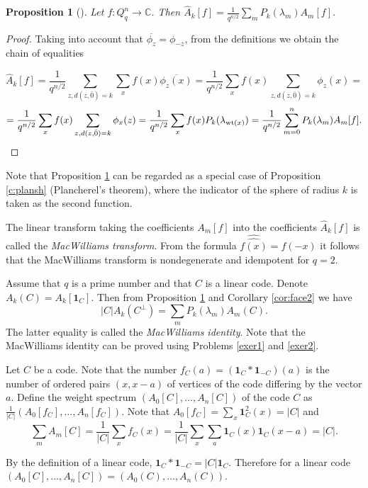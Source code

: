 \documentclass[11pt]{article}
\newtheorem{claim}{Proposition}[section]
\theoremstyle{definition}
\newcommand{\wt}{{\rm wt}}
\begin{document}
{{{\begin{claim}[\cite{MacW}]\label{c:eqMW}
Let $f:Q^n_q\rightarrow \mathbb{C}$. Then $\widehat{A}_k[f]=
\frac{1}{q^{n/2}}\sum\limits_m P_k(\lambda_m)A_m[f]$.
\end{claim}
\begin{proof}
Taking into account that $\overline{\phi_z}=\phi_{-z}$, from the definitions we obtain the chain of equalities

$$\widehat{A}_k[f]=\frac{1}{q^{n/2}}\sum\limits_{z,d(z,\bar 0)=k}\sum\limits_x
f(x)\overline{\phi_z(x)} = \frac{1}{q^{n/2}}\sum\limits_x
f(x)\sum\limits_{z,d(z,\bar 0)=k}\phi_z(x)=$$
$$=\frac{1}{q^{n/2}}\sum\limits_x
f(x)\sum\limits_{z,d(z,\bar 0)=k}\phi_x(z)=\frac{1}{q^{n/2}}\sum\limits_x
f(x)P_k(\lambda_{\wt(x)})=\frac{1}{q^{n/2}}\sum_{m=0}^n
P_k(\lambda_m)A_m[f].$$
\end{proof}


Note that Proposition \ref{c:eqMW} can be regarded as a special case of Proposition \ref{c:plansh} (Plancherel's theorem), where the indicator of the sphere of radius $k$ is taken as the second function.

The linear transform taking the coefficients $A_m[f]$ into the coefficients $\widehat{A}_k[f]$ is called the {\sl MacWilliams transform}.
From the formula $\widehat{\widehat{f(x)}}=f(-x)$ it follows that the MacWilliams transform is nondegenerate and idempotent for $q=2$.


Assume that  $q$ is a prime number and that $C$ is a linear code. Denote $A_k(C)= A_k[{\mathbf 1}_{C}]$. Then from Proposition \ref{c:eqMW} and Corollary \ref{cor:face2} we have
$$|C|A_k({C^\perp})=\sum\limits_m P_k(\lambda_m)A_m(C).$$
The latter equality is called the {\sl MacWilliams identity}. 
Note that the MacWilliams identity can be proved using Problems \ref{exer1} and \ref{exer2}.




Let $C$ be a code. Note that the number $f_{C}(a)=({\mathbf 1}_{C}\ast{\mathbf 1}_{-C})(a)$ is the number of ordered pairs $(x, x-a)$ of vertices of the code differing by the vector $a$. Define the weight spectrum $(A_0[C],\dots,A_n[C])$ of the code $C$ as $\frac{1}{|C|}(A_0[f_C],\dots,A_n[f_C])$. Note that $A_0[f_C]=\sum_x {\mathbf 1}^2_{C}(x)=|C|$ and
$$\sum\limits_mA_m[C]=\frac{1}{|C|}\sum_xf_{C}(x)=
\frac{1}{|C|}\sum_x\sum_a{\mathbf 1}_{C}(x){\mathbf 1}_{C}(x-a)=|C|.$$


 By the definition of a linear code, ${\mathbf 1}_{C}\ast{\mathbf 1}_{-C}=|C|{\mathbf 1}_{C}$.
 Therefore for a linear code $(A_0[C],\dots,A_n[C])= (A_0(C),\dots,A_n(C))$.

}}}
\end{document}
